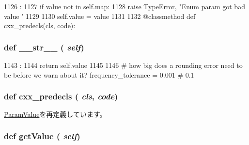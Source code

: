 \begin{DoxyCode}
1126                              :
1127         if value not in self.map:
1128             raise TypeError, "Enum param got bad value '%
1129                   %
1130         self.value = value
1131 
1132     @classmethod
    def cxx_predecls(cls, code):
\end{DoxyCode}
\hypertarget{classm5_1_1params_1_1Enum_aa7a4b9bc0941308e362738503137460e}{
\subsubsection[{\_\-\_\-str\_\-\_\-}]{\setlength{\rightskip}{0pt plus 5cm}def \_\-\_\-str\_\-\_\- ( {\em self})}}
\label{classm5_1_1params_1_1Enum_aa7a4b9bc0941308e362738503137460e}



\begin{DoxyCode}
1143                      :
1144         return self.value
1145 
1146 # how big does a rounding error need to be before we warn about it?
frequency_tolerance = 0.001  # 0.1%
\end{DoxyCode}
\hypertarget{classm5_1_1params_1_1Enum_a0b408a11a14bd1d770e28f71a6e14ab5}{
\subsubsection[{cxx\_\-predecls}]{\setlength{\rightskip}{0pt plus 5cm}def cxx\_\-predecls ( {\em cls}, \/   {\em code})}}
\label{classm5_1_1params_1_1Enum_a0b408a11a14bd1d770e28f71a6e14ab5}


\hyperlink{classm5_1_1params_1_1ParamValue_a0b408a11a14bd1d770e28f71a6e14ab5}{ParamValue}を再定義しています。


\hypertarget{classm5_1_1params_1_1Enum_acc340fbd4335fa34f9d57fb454b28ed0}{
\subsubsection[{getValue}]{\setlength{\rightskip}{0pt plus 5cm}def getValue ( {\em self})}}
\label{classm5_1_1params_1_1Enum_acc340fbd4335fa34f9d57fb454b28ed0}



